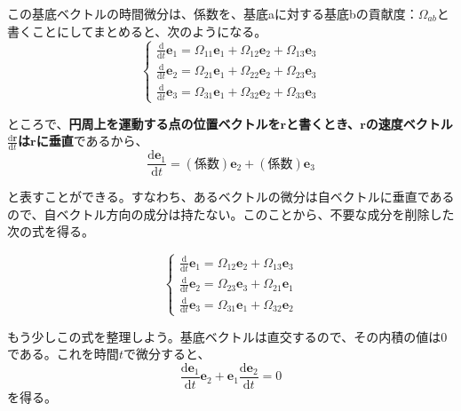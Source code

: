 \documentclass[twocolumn,a4j,10pt]{jarticle}
\begin{document}
この基底ベクトルの時間微分は、係数を、基底aに対する基底bの貢献度：$\Omega_{ab}$と書くことにしてまとめると、次のようになる。
\begin{equation}
  \left\{ \begin{array}{rl}
\frac{\mathrm{d} }{\mathrm{d} t} \bm{e}_1 = \Omega_{11} \bm{e}_1 + \Omega_{12} \bm{e}_2 + \Omega_{13} \bm{e}_3 \\
\frac{\mathrm{d} }{\mathrm{d} t} \bm{e}_2 = \Omega_{21} \bm{e}_1 + \Omega_{22} \bm{e}_2 + \Omega_{23} \bm{e}_3 \\
\frac{\mathrm{d} }{\mathrm{d} t} \bm{e}_3 = \Omega_{31} \bm{e}_1 + \Omega_{32} \bm{e}_2 + \Omega_{33} \bm{e}_3
  \label{speed_of_observer}
  \end{array} \right.
\end{equation}\newline

ところで、\textbf{円周上を運動する点の位置ベクトルを$\bm{r}$と書くとき、$\bm{r}$の速度ベクトル$\frac{\mathrm{d}\bm{r}}{\mathrm{d}t}$は$\bm{r}$に垂直}であるから、
\begin{equation}
  \frac{\mathrm{d} \bm{e}_1}{\mathrm{d} t} = (係数)\bm{e}_2 + (係数)\bm{e}_3 \nonumber
\end{equation}

と表すことができる。すなわち、あるベクトルの微分は自ベクトルに垂直であるので、自ベクトル方向の成分は持たない。このことから、不要な成分を削除した次の式を得る。

\begin{equation}
  \left\{ \begin{array}{rl}
\frac{\mathrm{d} }{\mathrm{d} t} \bm{e}_1 = \Omega_{12} \bm{e}_2 + \Omega_{13} \bm{e}_3 \\
\frac{\mathrm{d} }{\mathrm{d} t} \bm{e}_2 = \Omega_{23} \bm{e}_3 + \Omega_{21} \bm{e}_1 \\
\frac{\mathrm{d} }{\mathrm{d} t} \bm{e}_3 = \Omega_{31} \bm{e}_1 + \Omega_{32} \bm{e}_2
  \label{speed_of_observer}
  \end{array} \right.
\end{equation}\newline

もう少しこの式を整理しよう。基底ベクトルは直交するので、その内積の値は0である。これを時間$t$で微分すると、
\begin{equation}
  \frac{\mathrm{d} \bm{e}_1}{\mathrm{d} t} \bm{e}_2 + \bm{e}_1 \frac{\mathrm{d} \bm{e}_2}{\mathrm{d} t} = 0 \nonumber
\end{equation}
を得る。
\end{document}
